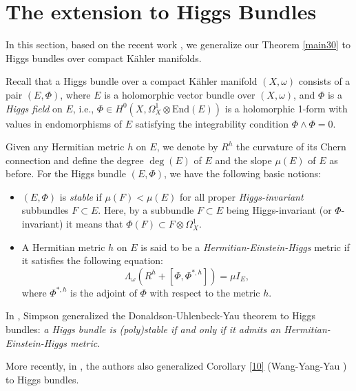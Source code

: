 \documentclass[11pt]{amsart}
\numberwithin{equation}{section}
\theoremstyle{remark}
\begin{document}

\section{The extension to Higgs Bundles}\label{s50}

In this section, based on the recent work \cite{WYY2}, we generalize our Theorem  \ref{main30} to Higgs bundles over compact K\"ahler manifolds.

Recall that a Higgs bundle over a compact K\"ahler manifold $(X,\omega)$ consists of a pair $(E, \Phi)$, where $E$ is a holomorphic vector bundle over $(X,\omega)$, and $\Phi$ is a {\it Higgs field} on $E$, i.e., $\Phi \in H^0(X, \Omega_X^1 \otimes \mathrm{End}(E))$ is a holomorphic 1-form with values in endomorphisms of $E$ satisfying the integrability condition $\Phi \wedge \Phi = 0.$

Given any Hermitian metric $h$ on $E$, we denote by $R^h$ the curvature of its Chern connection and define the {degree}  $\deg(E)$ of $E$ and the slope $\mu(E) $ of $E$ as before.
For the Higgs bundle $(E,\Phi)$, we have the following basic notions:

\begin{itemize}

\item[{$\bullet$}]
$(E,\Phi)$ is {\it stable} if  $\mu(F) < \mu(E)$ for all proper {\it Higgs-invariant} subbundles $F\subset E$. Here, by a subbundle $F\subset E$ being {Higgs-invariant} (or $\Phi$-invariant) it means that $\Phi(F)\subset F \otimes \Omega_X^1.$

\smallskip
\item[{$\bullet$}] A Hermitian metric $h$ on $E$ is said to be a {\it Hermitian-Einstein-Higgs} metric if it satisfies the following equation:
\[\Lambda_\omega (R^h + [\Phi,\Phi^{*,h}]) = \mu I_E,\]
where $\Phi^{*,h}$ is the adjoint of $\Phi$ with respect to the metric $h$. %

\end {itemize}

In \cite{sim1988}, Simpson generalized the Donaldson-Uhlenbeck-Yau theorem to Higgs bundles: {\it a Higgs bundle is (poly)stable if and only if it admits an Hermitian-Einstein-Higgs metric}.

\smallskip
More recently, in \cite{WYY2}, the authors also generalized Corollary \ref{10} (Wang-Yang-Yau \cite[Theorem 1.1] {WYY1}) to Higgs bundles.
\end{document}
